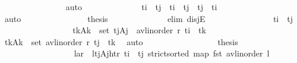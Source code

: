 \begin{isabellebody}
\ \ \ \ \ \ \ \ \ \ \ \ \ \ \isamarkupfalse%
\ auto\isanewline
\isanewline
\ \ \ \ \ \ \ \ \ \ \ \ \isamarkupfalse%
\ {\isachardoublequoteopen}t\isactrlsub i\ {\isacharless}{\kern0pt}\ t\isactrlsub j\ {\isasymor}\ t\isactrlsub i\ {\isacharequal}{\kern0pt}\ t\isactrlsub j\ {\isasymor}\ t\isactrlsub j\ {\isacharless}{\kern0pt}\ t\isactrlsub i{\isachardoublequoteclose}\isanewline
\ \ \ \ \ \ \ \ \ \ \ \ \ \ \isamarkupfalse%
\ auto\isanewline
\ \ \ \ \ \ \ \ \ \ \ \ \isamarkupfalse%
\ \isamarkupfalse%
\ {\isacharquery}{\kern0pt}thesis\isanewline
\ \ \ \ \ \ \ \ \ \ \ \ \isamarkupfalse%
\ {\isacharparenleft}{\kern0pt}elim\ disjE{\isacharparenright}{\kern0pt}\isanewline
\ \ \ \ \ \ \ \ \ \ \ \ \ \ \isamarkupfalse%
\ {\isachardoublequoteopen}t\isactrlsub i\ {\isacharless}{\kern0pt}\ t\isactrlsub j{\isachardoublequoteclose}\isanewline
\ \ \ \ \ \ \ \ \ \ \ \ \ \ \isamarkupfalse%
\ \isamarkupfalse%
\ {\isachardoublequoteopen}{\isasymforall}{\isacharparenleft}{\kern0pt}t\isactrlsub k{\isacharcomma}{\kern0pt}A\isactrlsub k{\isacharparenright}{\kern0pt}\ {\isasymin}\ set\ {\isacharparenleft}{\kern0pt}{\isacharparenleft}{\kern0pt}t\isactrlsub j{\isacharcomma}{\kern0pt}A\isactrlsub j{\isacharparenright}{\kern0pt}\ {\isacharhash}{\kern0pt}\ avl{\isacharunderscore}{\kern0pt}inorder\ r{\isacharparenright}{\kern0pt}{\isachardot}{\kern0pt}\ t\isactrlsub i\ {\isacharless}{\kern0pt}\ t\isactrlsub k{\isachardoublequoteclose}\isanewline
\ \ \ \ \ \ \ \ \ \ \ \ \ \ \ \ \isamarkupfalse%
\ {\isacartoucheopen}{\isasymforall}{\isacharparenleft}{\kern0pt}t\isactrlsub k{\isacharcomma}{\kern0pt}A\isactrlsub k{\isacharparenright}{\kern0pt}\ {\isasymin}\ set\ {\isacharparenleft}{\kern0pt}avl{\isacharunderscore}{\kern0pt}inorder\ r{\isacharparenright}{\kern0pt}{\isachardot}{\kern0pt}\ t\isactrlsub j\ {\isacharless}{\kern0pt}\ t\isactrlsub k{\isacartoucheclose}\ \isamarkupfalse%
\ auto\isanewline
\ \ \ \ \ \ \ \ \ \ \ \ \ \ \isamarkupfalse%
\ \isamarkupfalse%
\ {\isacharquery}{\kern0pt}thesis\isanewline
\ \ \ \ \ \ \ \ \ \ \ \ \ \ \ \ \isamarkupfalse%
\ {\isacartoucheopen}{\isasymlangle}l{\isacharcomma}{\kern0pt}a{\isacharcomma}{\kern0pt}r{\isasymrangle}\ {\isacharequal}{\kern0pt}\ {\isasymlangle}l{\isacharcomma}{\kern0pt}{\isacharparenleft}{\kern0pt}{\isacharparenleft}{\kern0pt}t\isactrlsub j{\isacharcomma}{\kern0pt}A\isactrlsub j{\isacharparenright}{\kern0pt}{\isacharcomma}{\kern0pt}ht{\isacharparenright}{\kern0pt}{\isacharcomma}{\kern0pt}r{\isasymrangle}{\isacartoucheclose}\ {\isacartoucheopen}t\isactrlsub i\ {\isacharless}{\kern0pt}\ t\isactrlsub j{\isacartoucheclose}\ {\isacartoucheopen}strict{\isacharunderscore}{\kern0pt}sorted\ {\isacharparenleft}{\kern0pt}map\ fst\ {\isacharparenleft}{\kern0pt}avl{\isacharunderscore}{\kern0pt}inorder\ l{\isacharparenright}{\kern0pt}{\isacharparenright}{\kern0pt}{\isacartoucheclose}\ \isanewline

\end{isabellebody}
